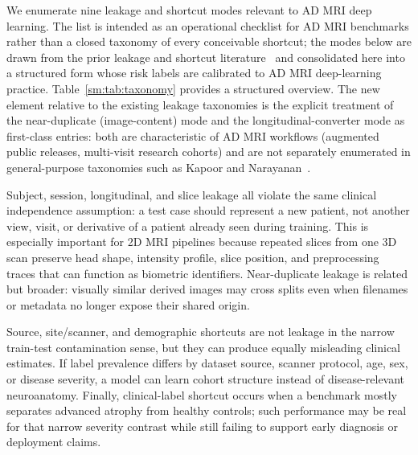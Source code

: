\documentclass[11pt]{article}
\begin{document}
We enumerate nine leakage and shortcut modes relevant to AD MRI deep
learning. The list is intended as an operational checklist for AD MRI
benchmarks rather than a closed taxonomy of every conceivable shortcut;
the modes below are drawn from the prior leakage and shortcut
literature~\cite{wen2020,yagis2021,kapoor2023leakage,roberts2021pitfalls,geirhos2020shortcut,oakden2020hidden}
and consolidated here into a structured form whose risk labels are
calibrated to AD MRI deep-learning practice.
Table~\ref{sm:tab:taxonomy} provides a structured overview. The new
element relative to the existing leakage taxonomies is the explicit
treatment of the near-duplicate (image-content) mode and the
longitudinal-converter mode as first-class entries: both are
characteristic of AD MRI workflows (augmented public releases,
multi-visit research cohorts) and are not separately enumerated in
general-purpose taxonomies such as Kapoor and
Narayanan~\cite{kapoor2023leakage}.



Subject, session, longitudinal, and slice leakage all violate the same
clinical independence assumption: a test case should represent a new
patient, not another view, visit, or derivative of a patient already seen
during training.
This is especially important for 2D MRI pipelines because repeated slices
from one 3D scan preserve head shape, intensity profile, slice position,
and preprocessing traces that can function as biometric identifiers.
Near-duplicate leakage is related but broader: visually similar derived
images may cross splits even when filenames or metadata no longer expose
their shared origin.

Source, site/scanner, and demographic shortcuts are not leakage in the
narrow train-test contamination sense, but they can produce equally
misleading clinical estimates.
If label prevalence differs by dataset source, scanner protocol, age, sex,
or disease severity, a model can learn cohort structure instead of
disease-relevant neuroanatomy.
Finally, clinical-label shortcut occurs when a benchmark mostly separates
advanced atrophy from healthy controls; such performance may be real for
that narrow severity contrast while still failing to support early
diagnosis or deployment claims.
\end{document}
